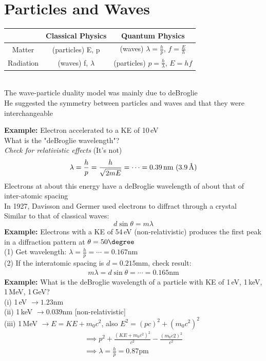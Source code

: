 \documentclass[a4paper, 11pt, fleqn, normalem]{report}
\begin{document}
\section{Particles and Waves}
\begin{tabular}{c|c|c}
              & Classical Physics    & Quantum Physics \\
    \hline
    Matter    & (particles) E, p     & (waves) $\lambda = \frac{h}{p}$, $f = \frac{E}{h}$                    \\
    \hline
    Radiation & (waves) f, $\lambda$ & (particles) $p = \frac{h}{\lambda}$, $E = hf$
\end{tabular} \\
The wave-particle duality model was mainly due to deBroglie \\
He suggested the symmetry between particles and waves and that they were interchangeable

\textbf{Example: }Electron accelerated to a KE of 10\,eV \\
What is the "deBroglie wavelength"? \\
\emph{Check for relativistic effects} (It's not)
\begin{equation*}
    \lambda = \frac{h}{p} = \frac{h}{\sqrt{2mE}} = \cdots = 0.39\,\text{nm}~(3.9\,\text{\r{A}})
\end{equation*}
Electrons at about this energy have a deBroglie wavelength of about that of inter-atomic spacing \\
In 1927, Davisson and Germer used electrons to diffract through a crystal \\
Similar to that of classical waves:
\begin{equation*}
    d\sin{\theta} = m\lambda
\end{equation*}
\textbf{Example: }Electrons with a KE of 54\,eV (non-relativistic) produces the first peak in a diffraction pattern at $\theta = 50\degree$ \\
(1) Get wavelength: $\lambda = \frac{h}{p} = \cdots = 0.167$nm \\
(2) If the interatomic spacing is $d = 0.215$mm, check result:
\begin{gather*}
    m\lambda = d\sin{\theta} = \cdots = 0.165\text{nm}
\end{gather*}
\textbf{Example: }What is the deBroglie wavelength of a particle with KE of 1\,eV, 1\,keV, 1\,MeV, 1\,GeV? \\
(i) 1\,eV $\rightarrow 1.23$nm \\
(ii) 1\,keV $\rightarrow 0.039$nm [non-relativistic] \\
(iii) 1\,MeV $\rightarrow E = KE + m_{0}c^{2}$, also $E^{2} = (pc)^{2} + (m_{0}c^{2})^{2}$
\begin{gather*}
    \implies p^{2} + \frac{(KE + m_{0}c^{2})^{2}}{c^{2}} - \frac{(m_{0}c{2})^{2}}{c^{2}} \\
    \implies \lambda = \frac{h}{p} = 0.87\text{pm}
\end{gather*}
\end{document}
